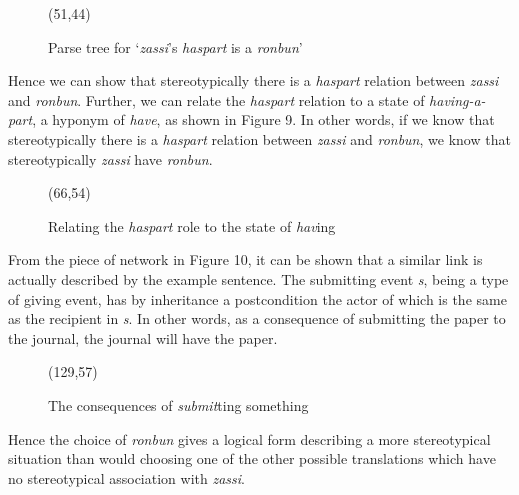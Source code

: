 \begin{figure}[htbp]
  \begin{center}
    \leavevmode
    \atari(51,44)

    \caption{Parse tree for `{\it zassi\/}'s {\it haspart\/}
             is a {\it ronbun\/}'}
  \end{center}
\end{figure}

Hence we can show that stereotypically there is a
{\it haspart\/}
relation between
{\it zassi\/}
and
{\it ronbun}.
Further, we can relate the
{\it haspart\/}
relation to a state of
{\it having-a-part},
a hyponym of
{\it have},
as shown in Figure 9.
In other words, if we know that stereotypically there is a
{\it haspart\/}
relation between
{\it zassi\/}
and
{\it ronbun},
we know that stereotypically {\it zassi\/} have {\it ronbun}.

\begin{figure}[htbp]
  \begin{center}
    \leavevmode
    \atari(66,54)

    \caption{Relating the {\it haspart\/} role to
             the state of {\it hav\/}ing}
  \end{center}
\end{figure}

From the piece of network in Figure 10, it can be shown that a similar
link is actually described by the example sentence.
The submitting event
{\it s},
being a type of giving event, has by inheritance a postcondition the
actor of which is the same as the recipient in
{\it s}.
In other words, as a consequence of submitting the paper to the journal,
the journal will have the paper.

\begin{figure}[htbp]
  \begin{center}
    \leavevmode
    \atari(129,57)
    
    \caption{The consequences of {\it submit\/}ting something}
  \end{center}
\end{figure}

Hence the choice of
{\it ronbun\/}
gives a logical form describing a more stereotypical situation than
would choosing one of the other possible translations which have no
stereotypical association with
{\it zassi}.

